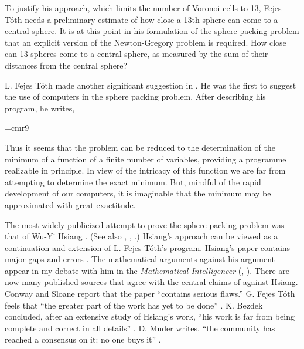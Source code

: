 To justify his approach, which limits the number of Voronoi cells
to 13, Fejes T\'oth needs a preliminary estimate of how close
a 13th sphere can come to a central sphere.  It is at this point
in his formulation of the sphere packing problem that an explicit
version of the Newton-Gregory problem is required.  How
close can 13 spheres come to a central sphere, as measured by
the sum of their distances from the central sphere?


L. Fejes T\'oth made another significant suggestion in \cite{Fej64}.
He was the first to suggest the use of computers in the sphere packing problem.
After describing his program, he writes,

{
\narrower
\font\ninerm=cmr9
\ninerm

Thus it seems that the problem can be reduced to the determination
of the minimum of a function of a finite number of variables,
providing a programme realizable in principle.  In view of the
intricacy of this function we are far from attempting to
determine the exact minimum.  But, mindful of the rapid development
of our computers, it is imaginable that the minimum may
be approximated with great exactitude.

}

\smallskip
The most widely publicized attempt to prove the sphere packing problem
was that of Wu-Yi Hsiang \cite{Hsi93}.  (See also \cite{Hsi93a},
\cite{Hsi93b}, \cite{Hsi02}.)  Hsiang's approach can be viewed as
a continuation and extension of L. Fejes T\'oth's program.
Hsiang's paper contains major gaps and errors \cite{CoHMS94}.
  The mathematical arguments against his argument appear
in my
debate with him in the {\it Mathematical Intelligencer}
(\cite{Hal94}, \cite{Hsi95}).
There are now many published sources that agree with the central
claims of \cite{Hal94} against Hsiang.
Conway and Sloane report that the paper ``contains serious flaws.''
G. Fejes T\'oth feels that ``the greater part of the work has yet
to be done'' \cite{Fej95}.   K. Bezdek concluded,
after an extensive study of Hsiang's work, ``his work is far from being
complete and correct in all details'' \cite{Bez97}.
 D. Muder writes, ``the
community has reached a consensus on it: no one buys it'' \cite{Mud97}.



